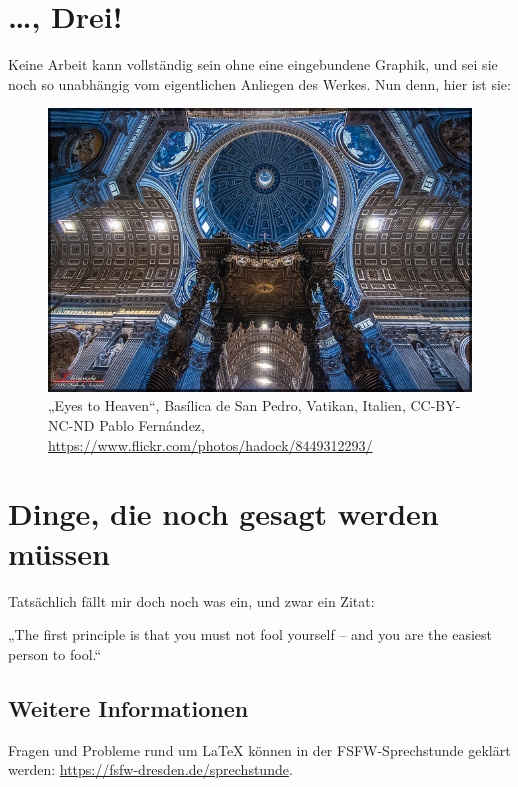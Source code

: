 \documentclass{scrbook}
\begin{document}
\chapter{\dots, Drei!}
\label{cha:drei}

Keine Arbeit kann vollständig sein ohne eine eingebundene Graphik, und sei sie
noch so unabhängig vom eigentlichen Anliegen des Werkes.  Nun denn, hier ist
sie:

\begin{figure}[h]
  \centering
  \includegraphics[width=\linewidth]{eyes-to-heaven.jpg}
  \caption{„Eyes to Heaven“, Basílica de San Pedro, Vatikan, Italien,
    CC-BY-NC-ND Pablo Fernández,
    \url{https://www.flickr.com/photos/hadock/8449312293/} }
  \label{fig:basilica-de-san-pedro}
\end{figure}

\appendix

\chapter{Dinge, die noch gesagt werden müssen}
\label{cha:dinge-die-noch}

Tatsächlich fällt mir doch noch was ein, und zwar ein Zitat:

\begin{displayquote}
  „The first principle is that you must not fool yourself – and you are the
  easiest person to fool.“
\end{displayquote}

\section{Weitere Informationen}
Fragen und Probleme rund um LaTeX können in der FSFW-Sprechstunde geklärt werden: 
\url{https://fsfw-dresden.de/sprechstunde}.
\end{document}
